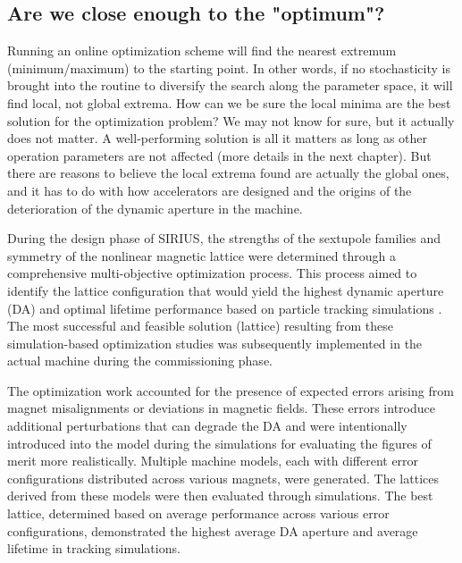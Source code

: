 \subsection{Are we close enough to the "optimum"?}
Running an online optimization scheme will find the nearest extremum (minimum/maximum) to the starting point. In other words, if no stochasticity is brought into the routine to diversify the search along the parameter space, it will find local, not global extrema. How can we be sure the local minima are the best solution for the optimization problem? We may not know for sure, but it actually does not matter. A well-performing solution is all it matters as long as other operation parameters are not affected (more details in the next chapter). But there are reasons to believe the local extrema found are actually the global ones, and it has to do with how accelerators are designed and the origins of the deterioration of the dynamic aperture in the machine.

During the design phase of SIRIUS, the strengths of the sextupole families and symmetry of the nonlinear magnetic lattice were determined through a comprehensive multi-objective optimization process. This process aimed to identify the lattice configuration that would yield the highest dynamic aperture (DA) and optimal lifetime performance based on particle tracking simulations \cite{de_sa_optimization_2016}. The most successful and feasible solution (lattice) resulting from these simulation-based optimization studies was subsequently implemented in the actual machine during the commissioning phase.

The optimization work accounted for the presence of expected errors arising from magnet misalignments or deviations in magnetic fields. These errors introduce additional perturbations that can degrade the DA and were intentionally introduced into the model during the simulations for evaluating the figures of merit more realistically. Multiple machine models, each with different error configurations distributed across various magnets, were generated. The lattices derived from these models were then evaluated through simulations. The best lattice, determined based on average performance across various error configurations, demonstrated the highest average DA aperture and average lifetime in tracking simulations.

